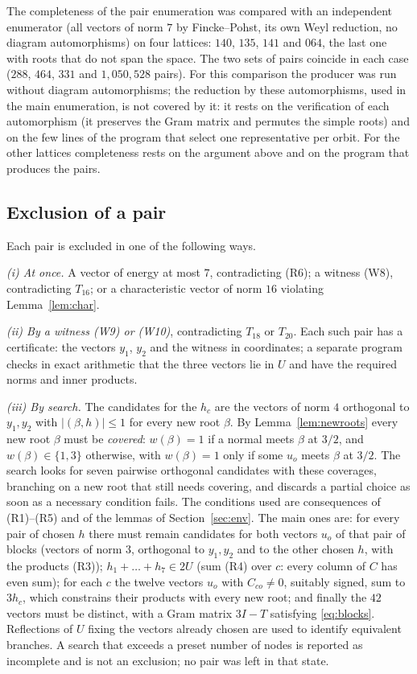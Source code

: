 \documentclass[11pt]{amsart}
\theoremstyle{definition}
\theoremstyle{remark}
\begin{document}
The completeness of the pair enumeration was compared with an independent enumerator (all vectors of norm $7$ by
Fincke--Pohst, its own Weyl reduction, no diagram automorphisms) on four lattices: $140$, $135$, $141$ and $064$, the last
one with roots that do not span the space. The two sets of pairs coincide in each case ($288$, $464$, $331$ and
$1{,}050{,}528$ pairs). For this comparison the producer was run without diagram automorphisms; the reduction by these
automorphisms, used in the main enumeration, is not covered by it: it rests on the verification of each automorphism (it preserves the
Gram matrix and permutes the simple roots) and on the few lines of the program that select one representative per orbit.
For the other lattices completeness rests on the argument above and on the program that produces the pairs.

\subsection{Exclusion of a pair}\label{ssec:excl}
Each pair is excluded in one of the following ways.

\smallskip\noindent\emph{(i) At once.} A vector of energy at most $7$, contradicting (R6); a witness (W8), contradicting
$T_{16}$; or a characteristic vector of norm $16$ violating Lemma~\ref{lem:char}.

\smallskip\noindent\emph{(ii) By a witness (W9) or (W10)}, contradicting $T_{18}$ or $T_{20}$. Each such pair has a
certificate: the vectors $y_1$, $y_2$ and the witness in coordinates; a separate program checks in exact arithmetic that the
three vectors lie in $U$ and have the required norms and inner products.

\smallskip\noindent\emph{(iii) By search.} The candidates for the $h_c$ are the vectors of norm $4$ orthogonal to
$y_1,y_2$ with $|(\beta,h)|\le1$ for every new root $\beta$. By Lemma~\ref{lem:newroots} every new root $\beta$ must be
\emph{covered}: $w(\beta)=1$ if a normal meets $\beta$ at $3/2$, and $w(\beta)\in\{1,3\}$ otherwise, with $w(\beta)=1$ only
if some $u_o$ meets $\beta$ at $3/2$. The search looks for seven pairwise orthogonal candidates with these coverages,
branching on a new root that still needs covering, and discards a partial choice as soon as a necessary condition fails.
The conditions used are consequences of (R1)--(R5) and of the lemmas of Section~\ref{sec:env}. The main ones are: for every
pair of chosen $h$ there must remain candidates for both vectors $u_o$ of that pair of blocks (vectors of norm $3$,
orthogonal to $y_1,y_2$ and to the other chosen $h$, with the products (R3)); $h_1+\dots+h_7\in2U$ (sum (R4) over $c$: every
column of $C$ has even sum); for each $c$ the twelve vectors $u_o$ with $C_{co}\neq0$, suitably signed, sum to $3h_c$, which
constrains their products with every new root; and finally the $42$ vectors must be distinct, with a Gram matrix $3I-T$
satisfying \eqref{eq:blocks}. Reflections of $U$ fixing the vectors already chosen are used to identify equivalent branches.
A search that exceeds a preset number of nodes is reported as incomplete and is not an exclusion; no pair was left in that
state.
\end{document}
